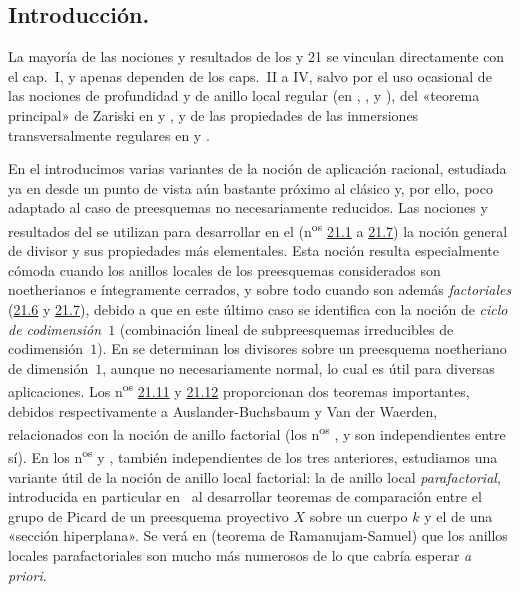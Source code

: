 \subsection{Introducción.}
\label{IV.20.0}

La mayoría de las nociones y resultados de los \textsection{} y 21 se vinculan directamente con el cap.~I, y apenas dependen de los caps.~II a IV, salvo por el uso ocasional de las nociones de profundidad y de anillo local regular (en , ,  y ), del «teorema principal» de Zariski en  y , y de las propiedades de las inmersiones transversalmente regulares en  y .

En el  introducimos varias variantes de la noción de aplicación racional, estudiada ya en  desde un punto de vista aún bastante próximo al clásico y, por ello, poco adaptado al caso de preesquemas no necesariamente reducidos.
Las nociones y resultados del  se utilizan para desarrollar en el  (n\textsuperscript{os} \hyperref[IV.21.1]{21.1} a \hyperref[IV.21.7]{21.7}) la noción general de divisor y sus propiedades más elementales.
Esta noción resulta especialmente cómoda cuando los anillos locales de los preesquemas considerados son noetherianos e íntegramente cerrados, y sobre todo cuando son además \emph{factoriales} (\hyperref[IV.21.6]{21.6} y \hyperref[IV.21.7]{21.7}), debido a que en este último caso se identifica con la noción de \emph{ciclo de codimensión~$1$} (combinación lineal de subpreesquemas irreducibles de codimensión~$1$).
En  se determinan los divisores sobre un preesquema noetheriano de dimensión~$1$, aunque no necesariamente normal, lo cual es útil para diversas aplicaciones.
Los n\textsuperscript{os} \hyperref[IV.21.11]{21.11} y \hyperref[IV.21.12]{21.12} proporcionan dos teoremas importantes, debidos respectivamente a Auslander-Buchsbaum y Van der Waerden, relacionados con la noción de anillo factorial (los n\textsuperscript{os} ,  y  son independientes entre sí).
En los n\textsuperscript{os}  y , también independientes de los tres anteriores, estudiamos una variante útil de la noción de anillo local factorial: la de anillo local \emph{parafactorial}, introducida en particular en~\cite{IV-41} al desarrollar teoremas de comparación entre el grupo de Picard de un preesquema proyectivo $X$ sobre un cuerpo $k$ y el de una «sección hiperplana».
Se verá en  (teorema de Ramanujam-Samuel) que los anillos locales parafactoriales son mucho más numerosos de lo que cabría esperar \emph{a priori}.

